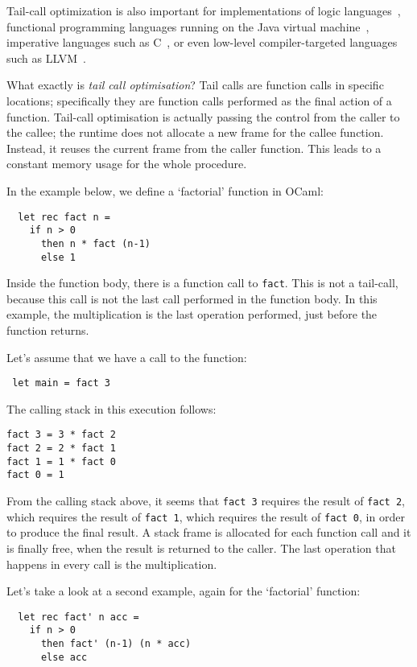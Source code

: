 \documentclass[diploma]{softlab-thesis}
\begin{document}
Tail-call optimization is also important for implementations of logic languages~\cite{Bigot99},
functional programming languages running on the Java virtual machine~\cite{Madsen:2018:TCE:3178372.3179499},
imperative languages such as C~\cite{baueran:mthesis:2003,Probst01}, or even low-level compiler-targeted languages such as
LLVM~\cite{Pandey:2015:LC:2842773}.

What exactly is \textit{tail call optimisation}? Tail calls are function calls in specific locations;
specifically they are function calls performed as the final action of a function. Tail-call optimisation is actually passing 
the control from the caller to the callee; the runtime does not allocate a new frame for the 
callee function. Instead, it reuses the current frame from the caller function. This leads to 
a constant memory usage for the whole procedure. 

In the example below, we define a `factorial' function in OCaml:
\begin{verbatim}
  let rec fact n = 
    if n > 0 
      then n * fact (n-1)
      else 1
\end{verbatim}

\noindent Inside the function body, there is a function call to \texttt{fact}. This is not a tail-call, because this call is not 
the last call performed in the function body. In this example, the multiplication is the last operation performed, just before the function returns.

Let's assume that we have a call to the function:
\begin{verbatim}
 let main = fact 3
\end{verbatim}

\noindent The calling stack in this execution follows:
\begin{verbatim}
fact 3 = 3 * fact 2
fact 2 = 2 * fact 1
fact 1 = 1 * fact 0 
fact 0 = 1
\end{verbatim}

From the calling stack above, it seems that \texttt{fact 3} requires the result of \texttt{fact 2}, which requires the result of \texttt{fact 1}, which 
requires the result of \texttt{fact 0}, in order to produce the final result. A stack frame is allocated for each function call and it is finally 
free, when the result is returned to the caller. The last operation that happens in every call is the multiplication.

Let's take a look at a second example, again for the `factorial' function:
\begin{verbatim}
  let rec fact' n acc = 
    if n > 0 
      then fact' (n-1) (n * acc)
      else acc 
\end{verbatim}
\end{document}
